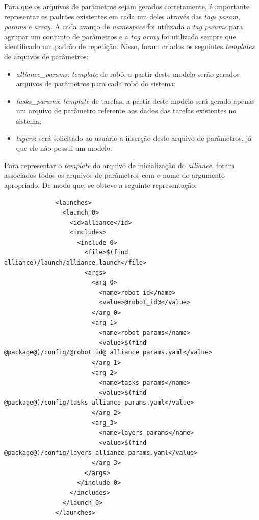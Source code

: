             Para que os arquivos de parâmetros sejam gerados corretamente, é importante representar os padrões existentes em cada um deles através das \textit{tags param}, \textit{params} e \textit{array}. A cada avanço de \textit{namespace} foi utilizada a \textit{tag params} para agrupar um conjunto de parâmetros e a \textit{tag array} foi utilizada sempre que identificado um padrão de repetição. Nisso, foram criados os seguintes \textit{templates} de arquivos de parâmetros: 
            
            \begin{itemize}
                \item \textit{alliance\_params}: \textit{template} de robô, a partir deste modelo serão gerados arquivos de parâmetros para cada robô do sistema;
                
                \item \textit{tasks\_params}: \textit{template} de tarefas, a partir deste modelo será gerado apenas um arquivo de parâmetro referente aos dados das tarefas existentes no sistema;
                
                \item \textit{layers}: será solicitado ao usuário a inserção deste arquivo de parâmetros, já que ele não possui um modelo.
            \end{itemize}
            
            Para representar o \textit{template} do arquivo de inicialização do \textit{alliance}, foram associados todos os arquivos de parâmetros com o nome do argumento apropriado. De modo que, se obteve a seguinte representação:
            
            \begin{lstlisting}
              <launches>
                <launch_0>
                  <id>alliance</id>
                  <includes>
                    <include_0>
                      <file>$(find alliance)/launch/alliance.launch</file>
                      <args>
                        <arg_0>
                          <name>robot_id</name>
                          <value>@robot_id@</value>
                        </arg_0>
                        <arg_1>
                          <name>robot_params</name>
                          <value>$(find @package@)/config/@robot_id@_alliance_params.yaml</value>
                        </arg_1>
                        <arg_2>
                          <name>tasks_params</name>
                          <value>$(find @package@)/config/tasks_alliance_params.yaml</value>
                        </arg_2>
                        <arg_3>
                          <name>layers_params</name>
                          <value>$(find @package@)/config/layers_alliance_params.yaml</value>
                        </arg_3>
                      </args>
                    </include_0>
                  </includes>
                </launch_0>
              </launches>
            \end{lstlisting}
            
